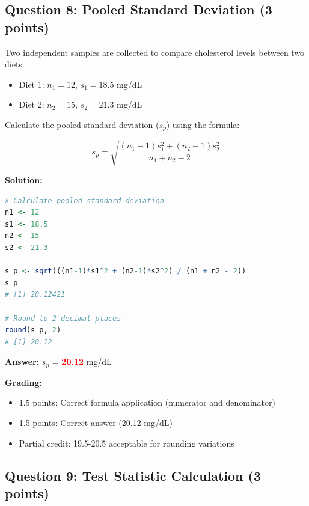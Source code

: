 \documentclass[11pt]{article}
\begin{document}
\vspace{1cm}

\subsection*{Question 8: Pooled Standard Deviation (3 points)}

Two independent samples are collected to compare cholesterol levels between two diets:

\begin{itemize}
\item Diet 1: $n_1 = 12$, $s_1 = 18.5$ mg/dL
\item Diet 2: $n_2 = 15$, $s_2 = 21.3$ mg/dL
\end{itemize}

Calculate the pooled standard deviation ($s_p$) using the formula:

$$s_p = \sqrt{\frac{(n_1-1)s_1^2 + (n_2-1)s_2^2}{n_1 + n_2 - 2}}$$

\vspace{0.3cm}

\textbf{Solution:}

\begin{lstlisting}[language=R,basicstyle=\small\ttfamily,frame=single]
# Calculate pooled standard deviation
n1 <- 12
s1 <- 18.5
n2 <- 15
s2 <- 21.3

s_p <- sqrt(((n1-1)*s1^2 + (n2-1)*s2^2) / (n1 + n2 - 2))
s_p
# [1] 20.12421

# Round to 2 decimal places
round(s_p, 2)
# [1] 20.12
\end{lstlisting}

\textbf{Answer:} $s_p$ = \textcolor{red}{\textbf{20.12}} mg/dL

\textbf{Grading:}
\begin{itemize}
\item 1.5 points: Correct formula application (numerator and denominator)
\item 1.5 points: Correct answer (20.12 mg/dL)
\item Partial credit: 19.5-20.5 acceptable for rounding variations
\end{itemize}

\vspace{1cm}

\subsection*{Question 9: Test Statistic Calculation (3 points)}
\end{document}
